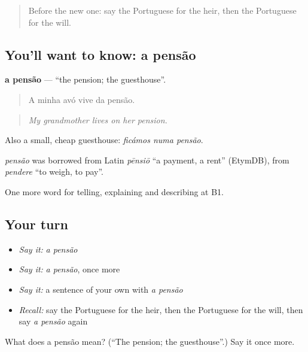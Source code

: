 \label{lesson:PT-C316-pensao}



\begin{quote}
Before the new one: say the Portuguese for the heir, then the Portuguese for the will.
\end{quote}

\subsection*{You'll want to know: a pensão}
\textbf{a pensão} — \textquotedblleft{}the pension; the guesthouse\textquotedblright{}.

\begin{quote}
A minha avó vive da pensão.
\end{quote}

\begin{quote}
\emph{My grandmother lives on her pension.}
\end{quote}

Also a small, cheap guesthouse: \emph{ficámos numa pensão}.

\begin{cousinweb}
\emph{pensão} was borrowed from Latin \emph{pēnsiō} \textquotedblleft{}a payment, a rent\textquotedblright{} (EtymDB), from \emph{pendere} \textquotedblleft{}to weigh, to pay\textquotedblright{}.
\end{cousinweb}

\begin{grammarlens}[title={What you've built}]
One more word for telling, explaining and describing at B1.
\end{grammarlens}

\subsection*{Your turn}
\begin{itemize}
\raggedright
  \item \emph{Say it:} \emph{a pensão}
  \item \emph{Say it:} \emph{a pensão}, once more
  \item \emph{Say it:} a sentence of your own with \emph{a pensão}
  \item \emph{Recall:} say the Portuguese for the heir, then the Portuguese for the will, then say \emph{a pensão} again
\end{itemize}

\begin{tcolorbox}[breakable,colback=teal!4,colframe=teal!35!black,title={Before you move on}]
What does a pensão mean? (\textquotedblleft{}The pension; the guesthouse\textquotedblright{}.) Say it once more.
\end{tcolorbox}
